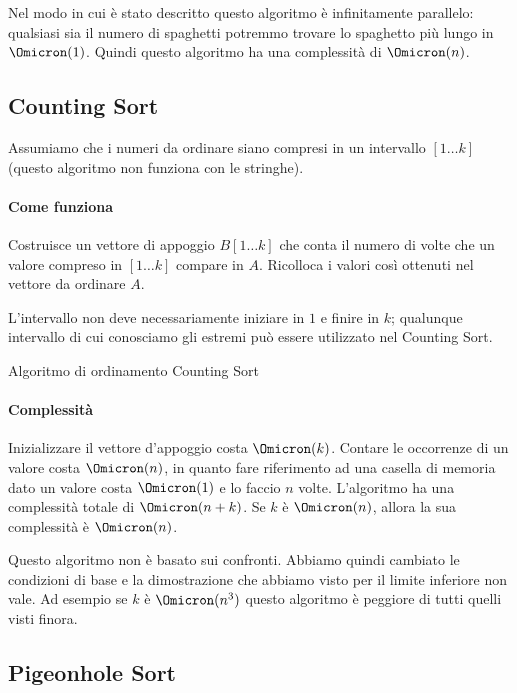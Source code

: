 Nel modo in cui è stato descritto questo algoritmo è infinitamente parallelo: qualsiasi sia il numero di spaghetti potremmo trovare lo spaghetto più lungo in \(\Omicron(1)\).
Quindi questo algoritmo ha una complessità di \(\Omicron(n)\).

\subsection{Counting Sort}

Assumiamo che i numeri da ordinare siano compresi in un intervallo \([1 \dots k]\) (questo algoritmo non funziona con le stringhe).

\paragraph{Come funziona}
Costruisce un vettore di appoggio \(B[1 \dots k]\) che conta il numero di volte che un valore compreso in \([1 \dots k]\) compare in \(A\).
Ricolloca i valori così ottenuti nel vettore da ordinare \(A\).

\begin{note}
L'intervallo non deve necessariamente iniziare in \(1\) e finire in \(k\); qualunque intervallo di cui conosciamo gli estremi può essere utilizzato nel Counting Sort.
\end{note}

\begin{algorithm}[H]
    \caption{Algoritmo di ordinamento Counting Sort}
    
\end{algorithm}

\paragraph{Complessità}
Inizializzare il vettore d'appoggio costa \(\Omicron(k)\).
Contare le occorrenze di un valore costa \(\Omicron(n)\), in quanto fare riferimento ad una casella di memoria dato un valore costa \(\Omicron(1)\) e lo faccio \(n\) volte.
L'algoritmo ha una complessità totale di \(\Omicron(n+k)\).
Se \(k\) è \(\Omicron(n)\), allora la sua complessità è \(\Omicron(n)\).

Questo algoritmo non è basato sui confronti.
Abbiamo quindi cambiato le condizioni di base e la dimostrazione che abbiamo visto per il limite inferiore non vale.
Ad esempio se \(k\) è \(\Omicron(n^3)\) questo algoritmo è peggiore di tutti quelli visti finora.

\clearpage
\subsection{Pigeonhole Sort}

